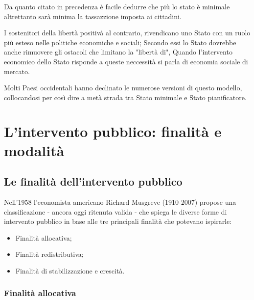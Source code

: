 \documentclass{report}
\begin{document}

Da quanto citato in precedenza è facile dedurre che più lo stato è minimale altrettanto sarà minima la tassazzione imposta ai cittadini. 

I sostenitori della libertà positivà al contrario, rivendicano uno Stato con un ruolo più esteso nelle politiche economiche e sociali; Secondo essi lo Stato dovrebbe anche rimuovere gli ostacoli che limitano la "libertà di", Quando l'intervento economico dello Stato risponde a queste neccessità si parla di economia sociale di mercato.

Molti Paesi occidentali hanno declinato le numerose versioni di questo modello, collocandosi per così dire a metà strada tra Stato minimale e Stato pianificatore.

\chapter{L'intervento pubblico: finalità e modalità} %
\label{chap:L'intervento pubblico: finalità e modalità}

\section{Le finalità dell'intervento pubblico}

Nell'1958 l'economista americano Richard Musgreve (1910-2007) propose una classificazione - ancora oggi ritenuta valida - che spiega le diverse forme di intervento pubblico in base alle tre principali finalità che potevano ispirarle:

\begin{itemize}
  \item Finalità allocativa;
  \item Finalità redistributiva;
  \item Finalità di stabilizzazione e crescità.
\end{itemize}

\subsection{Finalità allocativa}
\end{document}
